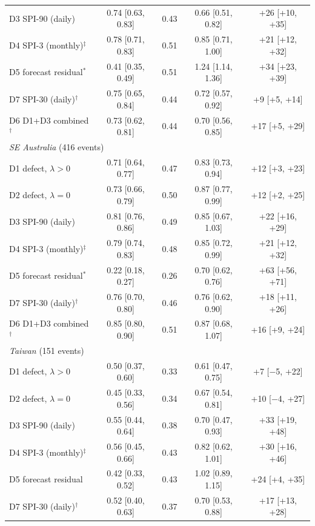 \begin{table}[tbp]
\begin{tabular*}{\textwidth}{@{\extracolsep\fill}lcccc}
\quad D3 SPI-90 (daily) & 0.74 [0.63, 0.83] & 0.43 & 0.66 [0.51, 0.82] & +26 [+10, +35] \\
\quad D4 SPI-3 (monthly)$^{\ddagger}$ & 0.78 [0.71, 0.83] & 0.51 & 0.85 [0.71, 1.00] & +21 [+12, +32] \\
\quad D5 forecast residual$^{\ast}$ & 0.41 [0.35, 0.49] & 0.51 & 1.24 [1.14, 1.36] & +34 [+23, +39] \\
\quad D7 SPI-30 (daily)$^{\dagger}$ & 0.75 [0.65, 0.84] & 0.44 & 0.72 [0.57, 0.92] & +9 [+5, +14] \\
\quad D6 D1+D3 combined$^{\dagger}$ & 0.73 [0.62, 0.81] & 0.44 & 0.70 [0.56, 0.85] & +17 [+5, +29] \\
\midrule
\multicolumn{5}{l}{\textit{SE Australia} (416 events)}\\
\quad D1 defect, $\lambda>0$ & 0.71 [0.64, 0.77] & 0.47 & 0.83 [0.73, 0.94] & +12 [+3, +23] \\
\quad D2 defect, $\lambda=0$ & 0.73 [0.66, 0.79] & 0.50 & 0.87 [0.77, 0.99] & +12 [+2, +25] \\
\quad D3 SPI-90 (daily) & 0.81 [0.76, 0.86] & 0.49 & 0.85 [0.67, 1.03] & +22 [+16, +29] \\
\quad D4 SPI-3 (monthly)$^{\ddagger}$ & 0.79 [0.74, 0.83] & 0.48 & 0.85 [0.72, 0.99] & +21 [+12, +32] \\
\quad D5 forecast residual$^{\ast}$ & 0.22 [0.18, 0.27] & 0.26 & 0.70 [0.62, 0.76] & +63 [+56, +71] \\
\quad D7 SPI-30 (daily)$^{\dagger}$ & 0.76 [0.70, 0.80] & 0.46 & 0.76 [0.62, 0.90] & +18 [+11, +26] \\
\quad D6 D1+D3 combined$^{\dagger}$ & 0.85 [0.80, 0.90] & 0.51 & 0.87 [0.68, 1.07] & +16 [+9, +24] \\
\midrule
\multicolumn{5}{l}{\textit{Taiwan} (151 events)}\\
\quad D1 defect, $\lambda>0$ & 0.50 [0.37, 0.60] & 0.33 & 0.61 [0.47, 0.75] & +7 [$-$5, +22] \\
\quad D2 defect, $\lambda=0$ & 0.45 [0.33, 0.56] & 0.34 & 0.67 [0.54, 0.81] & +10 [$-$4, +27] \\
\quad D3 SPI-90 (daily) & 0.55 [0.44, 0.64] & 0.38 & 0.70 [0.47, 0.93] & +33 [+19, +48] \\
\quad D4 SPI-3 (monthly)$^{\ddagger}$ & 0.56 [0.45, 0.66] & 0.43 & 0.82 [0.62, 1.01] & +30 [+16, +46] \\
\quad D5 forecast residual & 0.42 [0.33, 0.52] & 0.43 & 1.02 [0.89, 1.15] & +24 [+4, +35] \\
\quad D7 SPI-30 (daily)$^{\dagger}$ & 0.52 [0.40, 0.63] & 0.37 & 0.70 [0.53, 0.88] & +17 [+13, +28] \\

\end{tabular*}
\end{table}
